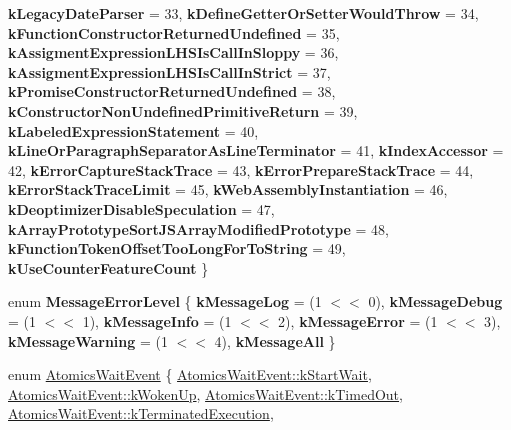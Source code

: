\begin{DoxyCompactItemize}
{\bfseries k\+Legacy\+Date\+Parser} = 33, 
{\bfseries k\+Define\+Getter\+Or\+Setter\+Would\+Throw} = 34, 
{\bfseries k\+Function\+Constructor\+Returned\+Undefined} = 35, 
\newline
{\bfseries k\+Assigment\+Expression\+L\+H\+S\+Is\+Call\+In\+Sloppy} = 36, 
{\bfseries k\+Assigment\+Expression\+L\+H\+S\+Is\+Call\+In\+Strict} = 37, 
{\bfseries k\+Promise\+Constructor\+Returned\+Undefined} = 38, 
{\bfseries k\+Constructor\+Non\+Undefined\+Primitive\+Return} = 39, 
\newline
{\bfseries k\+Labeled\+Expression\+Statement} = 40, 
{\bfseries k\+Line\+Or\+Paragraph\+Separator\+As\+Line\+Terminator} = 41, 
{\bfseries k\+Index\+Accessor} = 42, 
{\bfseries k\+Error\+Capture\+Stack\+Trace} = 43, 
\newline
{\bfseries k\+Error\+Prepare\+Stack\+Trace} = 44, 
{\bfseries k\+Error\+Stack\+Trace\+Limit} = 45, 
{\bfseries k\+Web\+Assembly\+Instantiation} = 46, 
{\bfseries k\+Deoptimizer\+Disable\+Speculation} = 47, 
\newline
{\bfseries k\+Array\+Prototype\+Sort\+J\+S\+Array\+Modified\+Prototype} = 48, 
{\bfseries k\+Function\+Token\+Offset\+Too\+Long\+For\+To\+String} = 49, 
{\bfseries k\+Use\+Counter\+Feature\+Count}
 \}
\item 
\mbox{\label{classv8_1_1Isolate_acfc7c4d5c93913201249045e2655d3dd}} 
enum {\bfseries Message\+Error\+Level} \{ \newline
{\bfseries k\+Message\+Log} = (1 $<$$<$ 0), 
{\bfseries k\+Message\+Debug} = (1 $<$$<$ 1), 
{\bfseries k\+Message\+Info} = (1 $<$$<$ 2), 
{\bfseries k\+Message\+Error} = (1 $<$$<$ 3), 
\newline
{\bfseries k\+Message\+Warning} = (1 $<$$<$ 4), 
{\bfseries k\+Message\+All}
 \}
\item 
enum \mbox{\hyperlink{classv8_1_1Isolate_aa4cfd46a1a22b1ec8fd061c7bbb8b331}{Atomics\+Wait\+Event}} \{ \newline
\mbox{\hyperlink{classv8_1_1Isolate_aa4cfd46a1a22b1ec8fd061c7bbb8b331afd7357214fb391682bb45afe6031f49f}{Atomics\+Wait\+Event\+::k\+Start\+Wait}}, 
\mbox{\hyperlink{classv8_1_1Isolate_aa4cfd46a1a22b1ec8fd061c7bbb8b331a40c9fd418fc634816641c687aca2edc3}{Atomics\+Wait\+Event\+::k\+Woken\+Up}}, 
\mbox{\hyperlink{classv8_1_1Isolate_aa4cfd46a1a22b1ec8fd061c7bbb8b331a9dabb3fa35e10c5439e234cb0c164b01}{Atomics\+Wait\+Event\+::k\+Timed\+Out}}, 
\mbox{\hyperlink{classv8_1_1Isolate_aa4cfd46a1a22b1ec8fd061c7bbb8b331a2d91831c05c55d57ab79761a657d2ae9}{Atomics\+Wait\+Event\+::k\+Terminated\+Execution}}, 
$$
\end{DoxyCompactItemize}
